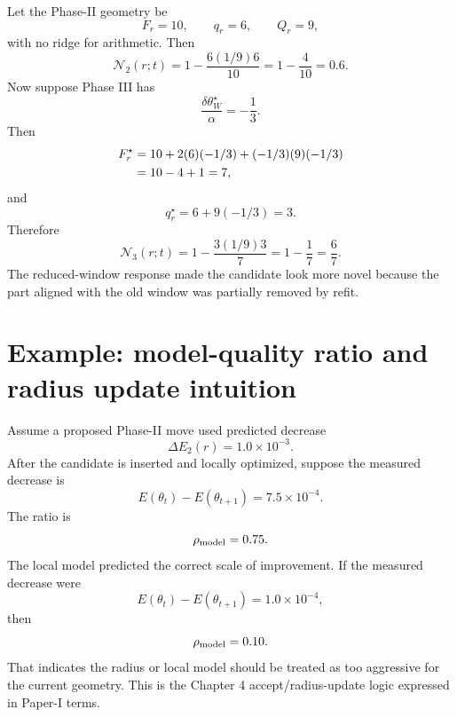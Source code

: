 \documentclass[10pt,twocolumn]{article}
\begin{document}
Let the Phase-II geometry be
\begin{equation}
F_r=10,\qquad
q_r=6,\qquad
Q_r=9,
\label{eq:N23_data}
\end{equation}
with no ridge for arithmetic. Then
\begin{equation}
\mathcal N_2(r;t)
=1-\frac{6(1/9)6}{10}
=1-\frac{4}{10}=0.6.
\label{eq:N2_example}
\end{equation}
Now suppose Phase III has
\begin{equation}
\frac{\delta\theta_W^\star}{\alpha}=-\frac13.
\label{eq:N23_w}
\end{equation}
Then
\begin{align}
F_r^\star
&=10+2(6)(-1/3)+(-1/3)(9)(-1/3)
\notag\\
&=10-4+1=7,
\label{eq:N23_Fred}
\end{align}
and
\begin{equation}
q_r^\star=6+9(-1/3)=3.
\label{eq:N23_qred}
\end{equation}
Therefore
\begin{equation}
\mathcal N_3(r;t)
=1-\frac{3(1/9)3}{7}
=1-\frac{1}{7}
=\frac67.
\label{eq:N3_example}
\end{equation}
The reduced-window response made the candidate look more novel because the part aligned with the old window was partially removed by refit.

\section{Example: model-quality ratio and radius update intuition}

Assume a proposed Phase-II move used predicted decrease
\begin{equation}
\Delta E_2(r)=1.0\times10^{-3}.
\label{eq:ratio_pred}
\end{equation}
After the candidate is inserted and locally optimized, suppose the measured decrease is
\begin{equation}
E(\theta_t)-E(\theta_{t+1})=7.5\times10^{-4}.
\label{eq:ratio_actual}
\end{equation}
The ratio is
\begin{equation}
\rho_{\rm model}=0.75.
\label{eq:ratio_good}
\end{equation}
The local model predicted the correct scale of improvement. If the measured decrease were
\begin{equation}
E(\theta_t)-E(\theta_{t+1})=1.0\times10^{-4},
\label{eq:ratio_bad_actual}
\end{equation}
then
\begin{equation}
\rho_{\rm model}=0.10.
\label{eq:ratio_bad}
\end{equation}
That indicates the radius or local model should be treated as too aggressive for the current geometry. This is the Chapter 4 accept/radius-update logic expressed in Paper-I terms.
\end{document}
